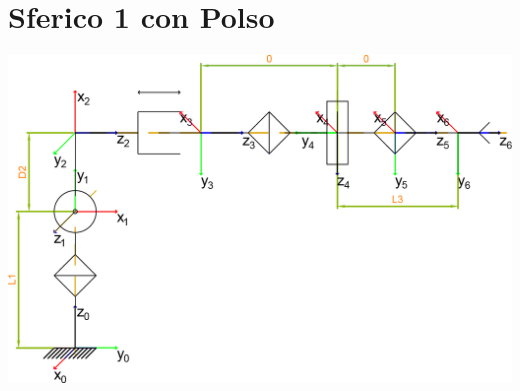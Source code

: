 \documentclass[a4paper,11pt]{article}
\begin{document}
\section*{Sferico 1 con Polso}
\includegraphics{Sorgenti/Strutture+Polso/Sferico1+p.png}

\end{document}
